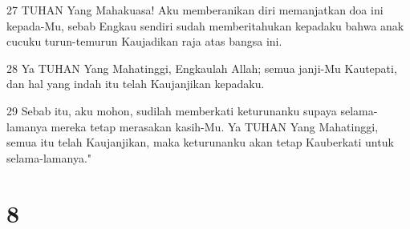 \par 27 TUHAN Yang Mahakuasa! Aku memberanikan diri memanjatkan doa ini kepada-Mu, sebab Engkau sendiri sudah memberitahukan kepadaku bahwa anak cucuku turun-temurun Kaujadikan raja atas bangsa ini.
\par 28 Ya TUHAN Yang Mahatinggi, Engkaulah Allah; semua janji-Mu Kautepati, dan hal yang indah itu telah Kaujanjikan kepadaku.
\par 29 Sebab itu, aku mohon, sudilah memberkati keturunanku supaya selama-lamanya mereka tetap merasakan kasih-Mu. Ya TUHAN Yang Mahatinggi, semua itu telah Kaujanjikan, maka keturunanku akan tetap Kauberkati untuk selama-lamanya."

\chapter{8}

